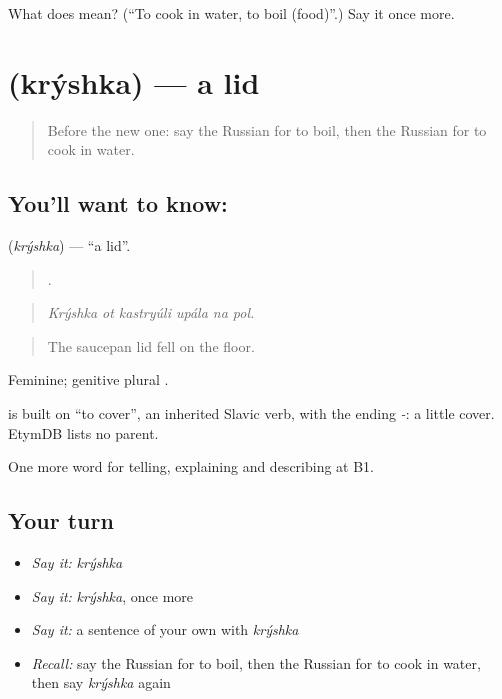 \begin{tcolorbox}[breakable,colback=teal!4,colframe=teal!35!black,title={Before you move on}]
What does  mean? (\textquotedblleft{}To cook in water, to boil (food)\textquotedblright{}.) Say it once more.
\end{tcolorbox}
\section[\texorpdfstring{\ru{крышка} (krýshka)}{крышка (krýshka)}]{ (krýshka) — a lid}

\label{lesson:RU-C329-kryshka}



\begin{quote}
Before the new one: say the Russian for to boil, then the Russian for to cook in water.
\end{quote}

\subsection*{You'll want to know: }
\textbf{} (\emph{krýshka}) — \textquotedblleft{}a lid\textquotedblright{}.

\begin{quote}
     .
\end{quote}

\begin{quote}
\emph{Krýshka ot kastryúli upála na pol.}
\end{quote}

\begin{quote}
The saucepan lid fell on the floor.
\end{quote}

Feminine; genitive plural \emph{}.

\begin{cousinweb}
\emph{} is built on \emph{} \textquotedblleft{}to cover\textquotedblright{}, an inherited Slavic verb, with the ending \emph{-}: a little cover. EtymDB lists no parent.
\end{cousinweb}

\begin{grammarlens}[title={What you've built}]
One more word for telling, explaining and describing at B1.
\end{grammarlens}

\subsection*{Your turn}
\begin{itemize}
\raggedright
  \item \emph{Say it:} \emph{krýshka}
  \item \emph{Say it:} \emph{krýshka}, once more
  \item \emph{Say it:} a sentence of your own with \emph{krýshka}
  \item \emph{Recall:} say the Russian for to boil, then the Russian for to cook in water, then say \emph{krýshka} again
\end{itemize}

